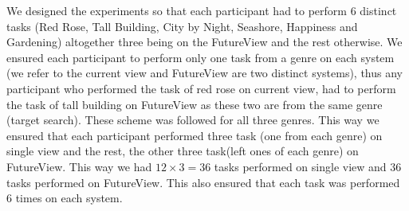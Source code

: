 \documentclass[english]{tktltiki}
\begin{document}
We designed the experiments so that each participant had to perform 6 distinct tasks (Red Rose, Tall Building, City by Night, Seashore, Happiness and Gardening) altogether three being on the FutureView and the rest otherwise. We ensured each participant to perform only one task from a genre on each system (we refer to the current view and FutureView are two distinct systems), thus any participant who performed the task of red rose on current view, had to perform the task of tall building on FutureView as these two are from the same genre (target search). These scheme was followed for all three genres. This way we ensured that each participant performed three task (one from each genre) on single view and the rest, the other three task(left ones of each genre) on FutureView. This way we had $12 \times 3 = 36$ tasks performed on single view and $36$ tasks performed on FutureView. This also ensured that each task was performed $6$ times on each system.
\end{document}

